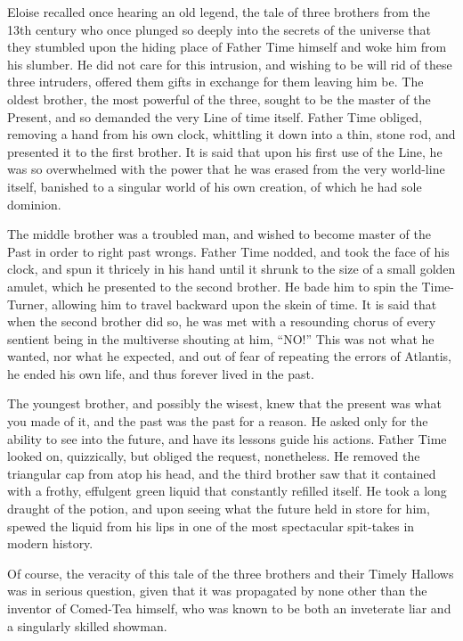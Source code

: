 Eloise recalled once hearing an old legend, the tale of three brothers from the 13th century who once plunged so deeply into the secrets of the universe that they stumbled upon the hiding place of Father Time himself and woke him from his slumber. He did not care for this intrusion, and wishing to be will rid of these three intruders, offered them gifts in exchange for them leaving him be. The oldest brother, the most powerful of the three, sought to be the master of the Present, and so demanded the very Line of time itself. Father Time obliged, removing a hand from his own clock, whittling it down into a thin, stone rod, and presented it to the first brother. It is said that upon his first use of the Line, he was so overwhelmed with the power that he was erased from the very world-line itself, banished to a singular world of his own creation, of which he had sole dominion.

The middle brother was a troubled man, and wished to become master of the Past in order to right past wrongs. Father Time nodded, and took the face of his clock, and spun it thricely in his hand until it shrunk to the size of a small golden amulet, which he presented to the second brother. He bade him to spin the Time-Turner, allowing him to travel backward upon the skein of time. It is said that when the second brother did so, he was met with a resounding chorus of every sentient being in the multiverse shouting at him, “NO!” This was not what he wanted, nor what he expected, and out of fear of repeating the errors of Atlantis, he ended his own life, and thus forever lived in the past.

The youngest brother, and possibly the wisest, knew that the present was what you made of it, and the past was the past for a reason. He asked only for the ability to see into the future, and have its lessons guide his actions. Father Time looked on, quizzically, but obliged the request, nonetheless. He removed the triangular cap from atop his head, and the third brother saw that it contained with a frothy, effulgent green liquid that constantly refilled itself. He took a long draught of the potion, and upon seeing what the future held in store for him, spewed the liquid from his lips in one of the most spectacular spit-takes in modern history.

Of course, the veracity of this tale of the three brothers and their Timely Hallows was in serious question, given that it was propagated by none other than the inventor of Comed-Tea himself, who was known to be both an inveterate liar and a singularly skilled showman.

